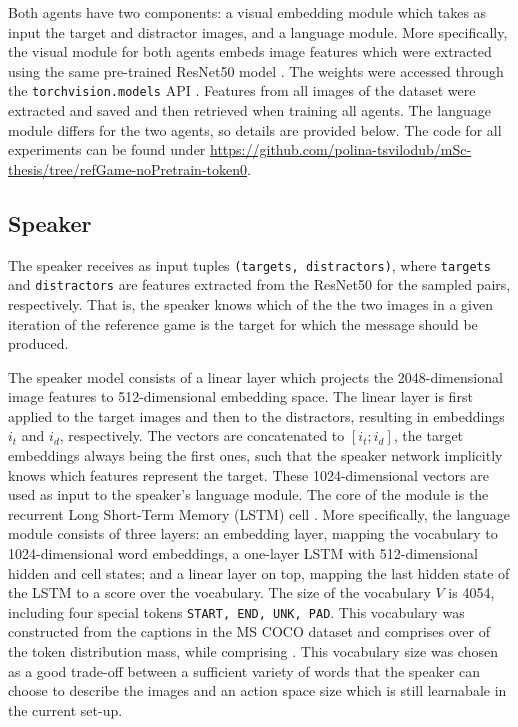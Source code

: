 Both agents have two components: a visual embedding module which takes as input the target and distractor images, and a language module. More specifically, the visual module for both agents embeds image features which were extracted using the same pre-trained ResNet50 model \parencite{he2016deep}. The weights were accessed through the \texttt{torchvision.models} API \parencite{marcel2010torchvision}. Features from all images of the dataset were extracted and saved and then retrieved when training all agents. 
The language module differs for the two agents, so details are provided below. 
The code for all experiments can be found under \url{https://github.com/polina-tsvilodub/mSc-thesis/tree/refGame-noPretrain-token0}. 

\subsection{Speaker}
The speaker receives as input tuples \texttt{(targets, distractors)}, where \texttt{targets} and \texttt{distractors} are features extracted from the ResNet50 for the sampled pairs, respectively. That is, the speaker knows which of the the two images in a given iteration of the reference game is the target for which the message should be produced. 

The speaker model consists of a linear layer which projects the 2048-dimensional image features to 512-dimensional embedding space.  The linear layer is first applied to the target images and then to the distractors, resulting in embeddings $i_t$ and $i_d$, respectively. The vectors are concatenated to $[i_t; i_d]$, the target embeddings always being the first ones, such that the speaker network implicitly knows which features represent the target. These 1024-dimensional vectors are used as input to the speaker's language module. The core of the module is the recurrent Long Short-Term Memory (LSTM) cell \parencite{hochreiter1997long}. More specifically, the language module consists of three layers: an embedding layer, mapping the vocabulary to 1024-dimensional word embeddings, a one-layer LSTM with 512-dimensional hidden and cell states; and a linear layer on top, mapping the last hidden state of the LSTM to a score over the vocabulary. The size of the vocabulary $V$ is 4054, including four special tokens \texttt{START, END, UNK, PAD}. This vocabulary was constructed from the captions in the MS COCO dataset and comprises over  of the token distribution mass, while comprising . This vocabulary size was chosen as a good trade-off between a sufficient variety of words that the speaker can choose to describe the images and an action space size which is still learnabale in the current set-up. 

